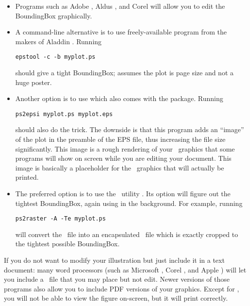 \begin{itemize}
\item Programs such as Adobe , Aldus , and Corel  will allow you to edit the BoundingBox graphically.

\item A command-line alternative is to use freely-available program  from the makers of Aladdin .  Running
\small
\begin{verbatim}
epstool -c -b myplot.ps
\end{verbatim}
\normalsize
should give a tight BoundingBox;  assumes the plot is page size and not a huge poster.

\item Another option is to use  which also comes with the  package.  Running
\small
\begin{verbatim}
ps2epsi myplot.ps myplot.eps
\end{verbatim}
\normalsize
should also do the trick. The downside is that this program adds an ``image'' of the plot in the preamble of the EPS file, thus increasing the file size significantly. This image is a rough rendering of your \PS\ graphics that some programs will show on screen while you are editing your document. This image is basically a placeholder for the \PS\ graphics that will actually be printed.

\item The preferred option is to use the \GMT\ utility . Its  option will figure out the tightest BoundingBox, again using  in the background. For example, running
\small
\begin{verbatim}
ps2raster -A -Te myplot.ps
\end{verbatim}
\normalsize
will convert the \PS\ file  into an encapsulated \PS\ file  which is exactly cropped to the tightest possible BoundingBox.
\end{itemize}

If you do not want to modify your illustration but just include it in a text document: many word processors (such as Microsoft , Corel , and Apple ) will let you include a \PS\ file that you may place but not edit. Newer versions of those programs also allow you to include PDF versions of your graphics. Except for , 
you will not be able to view the figure on-screen, but it will print correctly.

